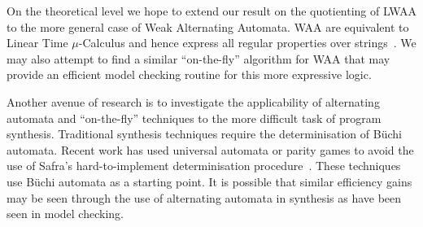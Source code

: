 \documentclass{article}
\begin{document}
On the theoretical level we hope to extend our result on the
quotienting of LWAA to the more general case of Weak Alternating
Automata.  WAA are equivalent to Linear Time $\mu$-Calculus and hence
express all regular properties over strings~\cite{L05}.  We may also attempt to
find a similar ``on-the-fly'' algorithm for WAA that may provide an
efficient model checking routine for this more expressive logic.

Another avenue of research is to investigate the applicability of
alternating automata and ``on-the-fly'' techniques to the more
difficult task of program synthesis.  Traditional synthesis techniques
require the determinisation of B\"uchi automata.  Recent work has used
universal automata or parity games to avoid the use of Safra's
hard-to-implement determinisation procedure~\cite{KV05,HP06}.  These
techniques use B\"uchi automata as a starting point.  It is possible
that similar efficiency gains may be seen through the use of
alternating automata in synthesis as have been seen in model checking.




\end{document}
